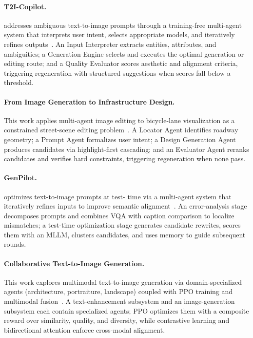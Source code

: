 \paragraph{T2I-Copilot.}
 addresses ambiguous text-to-image prompts through a training-free multi-agent system that interprets user intent, selects appropriate models, and iteratively refines outputs~\cite{chen2025t2icopilot}. An Input Interpreter extracts entities, attributes, and ambiguities; a Generation Engine selects and executes the optimal generation or editing route; and a Quality Evaluator scores aesthetic and alignment criteria, triggering regeneration with structured suggestions when scores fall below a threshold. 

\paragraph{From Image Generation to Infrastructure Design.}
This work applies multi-agent image editing to bicycle-lane visualization as a constrained street-scene editing problem~\cite{avg250905469}. A Locator Agent identifies roadway geometry; a Prompt Agent formalizes user intent; a Design Generation Agent produces candidates via highlight-first cascading; and an Evaluator Agent reranks candidates and verifies hard constraints, triggering regeneration when none pass.

\paragraph{GenPilot.}
 optimizes text-to-image prompts at test- time via a multi-agent system that iteratively refines inputs to improve semantic alignment~\cite{avg251007217}. An error-analysis stage decomposes prompts and combines VQA with caption comparison to localize mismatches; a test-time optimization stage generates candidate rewrites, scores them with an MLLM, clusters candidates, and uses memory to guide subsequent rounds.

\paragraph{Collaborative Text-to-Image Generation.}
This work explores multimodal text-to-image generation via domain-specialized agents (architecture, portraiture, landscape) coupled with PPO training and multimodal fusion~\cite{avg251010633}. A text-enhancement subsystem and an image-generation subsystem each contain specialized agents; PPO optimizes them with a composite reward over similarity, quality, and diversity, while contrastive learning and bidirectional attention enforce cross-modal alignment. 


